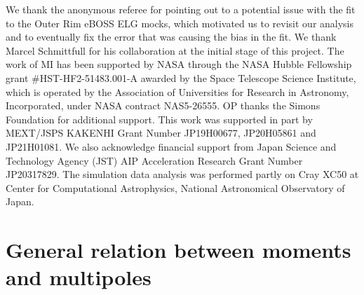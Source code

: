 \documentclass[12pt,a4paper]{article}
\begin{document}
We thank the anonymous referee for pointing out to a potential issue with the fit 
to the Outer Rim eBOSS ELG mocks,  
which motivated us 
to revisit our analysis
and to eventually fix the error that was
causing the bias in the fit.
We thank Marcel Schmittfull for his collaboration at the initial stage of this 
project.
The work of 
MI has been supported by NASA through the NASA Hubble Fellowship grant \#HST-HF2-51483.001-A awarded by the Space Telescope Science Institute, which is operated by the Association of Universities for Research in Astronomy, Incorporated, under NASA contract NAS5-26555. OP thanks the Simons Foundation for additional support. 
This work was supported in part by MEXT/JSPS KAKENHI Grant Number JP19H00677, JP20H05861 and JP21H01081.
We also acknowledge financial support from Japan Science and Technology Agency (JST) AIP Acceleration Research Grant Number JP20317829.
The simulation data analysis was performed partly on Cray XC50 at Center for Computational Astrophysics, National Astronomical Observatory of Japan.





\appendix 

\section{General relation between moments and multipoles}
\label{sec:gen}
\end{document}
